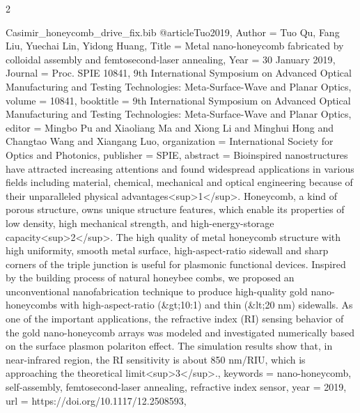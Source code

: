 \documentclass[twoside, 10pt]{article}
\def\myfilename{Casimir_honeycomb_drive_fix}
\begin{document}
\begin{multicols}{2}
\begin{filecontents}{\myfilename.bib}
@article{Tuo2019,
    Author = {Tuo Qu, Fang Liu, Yuechai Lin, Yidong Huang},
    Title = {Metal nano-honeycomb fabricated by colloidal assembly and femtosecond-laser annealing},
    Year = {30 January 2019},
    Journal = {Proc. SPIE 10841, 9th International Symposium on Advanced Optical Manufacturing and Testing Technologies: Meta-Surface-Wave and Planar Optics},
    volume = {10841},
    booktitle = {9th International Symposium on Advanced Optical Manufacturing and Testing Technologies: Meta-Surface-Wave and Planar Optics},
    editor = {Mingbo Pu and Xiaoliang Ma and Xiong Li and Minghui Hong and Changtao Wang and Xiangang Luo},
    organization = {International Society for Optics and Photonics},
    publisher = {SPIE},
    abstract = {Bioinspired nanostructures have attracted increasing attentions and found widespread applications in various fields including material, chemical, mechanical and optical engineering because of their unparalleled physical advantages<sup>1</sup>. Honeycomb, a kind of porous structure, owns unique structure features, which enable its properties of low density, high mechanical strength, and high-energy-storage capacity<sup>2</sup>. The high quality of metal honeycomb structure with high uniformity, smooth metal surface, high-aspect-ratio sidewall and sharp corners of the triple junction is useful for plasmonic functional devices. Inspired by the building process of natural honeybee combs, we proposed an unconventional nanofabrication technique to produce high-quality gold nano-honeycombs with high-aspect-ratio (&gt;10:1) and thin (&lt;20 nm) sidewalls. As one of the important applications, the refractive index (RI) sensing behavior of the gold nano-honeycomb arrays was modeled and investigated numerically based on the surface plasmon polariton effect. The simulation results show that, in near-infrared region, the RI sensitivity is about 850 nm/RIU, which is approaching the theoretical limit<sup>3</sup>.},
    keywords = {nano-honeycomb, self-assembly, femtosecond-laser annealing, refractive index sensor},
    year = {2019},
    url = {https://doi.org/10.1117/12.2508593},
}



\end{filecontents}
\end{multicols}
\end{document}
